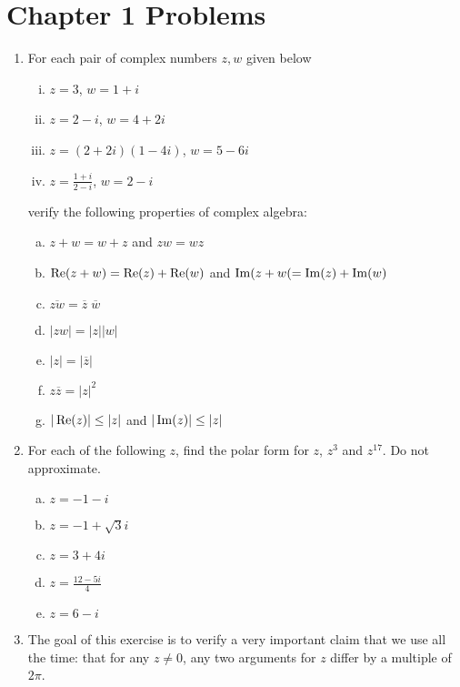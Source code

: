 \section*{Chapter 1 Problems}

\begin{enumerate}
\item For each pair of complex numbers $z,w$ given below

\begin{enumerate}[i)]
\item $z = 3$, $w = 1 + i$
\item $z =2 - i $, $w =4 + 2i $
\item $z =(2 + 2i)(1 - 4i) $, $w = 5 - 6i$
\item $z = \frac{1 + i}{2 - i} $, $w = 2 - i $
\end{enumerate}

\noindent verify the following properties of complex algebra:

\begin{enumerate}[a)]
\item $z+w = w+z$ and $zw = wz$
\item $\operatorname{Re}(z + w) = \operatorname{Re}(z) + \operatorname{Re}(w)$ and $\operatorname{Im}(z + w( = \operatorname{Im}(z) + \operatorname{Im}(w)$
\item $\overline{zw} = \overline{z}\;\overline{w}$
\item $|zw| = |z||w|$
\item $|z| = |\overline{z}|$
\item $z\overline{z} = |z|^2$
\item $|\operatorname{Re}(z)| \le |z|$ and $|\operatorname{Im}(z)|\le |z|$

\end{enumerate}

\item For each of the following $z$, find the polar form for $z$, $z^3$ and $z^{17}$. Do not approximate.

\begin{enumerate}[a)]
\item $z =-1 - i $
\item $z = -1 + \sqrt{3}i $
\item $z = 3 + 4i$
\item $z = \frac{12 - 5i}{4}$
\item $z = 6 - i$

\end{enumerate}

\item The goal of this exercise is to verify a very important claim that we use all the time: that for any $z \ne 0$, any two arguments for $z$ differ by a multiple of $2\pi$.


\end{enumerate}
